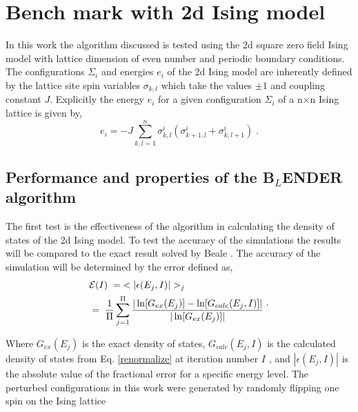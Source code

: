 \documentclass[aps,pre,reprint,superscriptaddress,showkeys]{revtex4-1}
\begin{document}
\section{Bench mark with 2d Ising model}
\label{sec2}

In this work the algorithm discussed is tested using the 2d square zero field  Ising model with lattice dimension of even number\cite{exact_statistical,Onsager,Ising} and periodic boundary conditions. The configurations $\Sigma_i$ and energies $e_i$ of the 2d Ising model are inherently defined by the lattice site spin variables $\sigma_{k,l}$ which take the values $\pm 1$ and coupling constant $J$. Explicitly the energy $e_i$ for a given configuration $\Sigma_i$ of a n$\times$n Ising lattice is given by, 
\begin{equation}
e_i = -J\sum_{k,l=1}^{n}\sigma_{k,l}^{i}(\sigma_{k+1,l}^{i} + \sigma_{k,l+1}^{i})\;.
\end{equation}

\subsection{Performance and properties of the B$_L$ENDER algorithm}
  The first test is the effectiveness of the algorithm in calculating the density of states of the 2d Ising model.  To test the accuracy of the simulations the results will be compared to the exact result solved by Beale \cite{Beale_2d_ising}. The accuracy of the simulation will be determined by the error defined as, 
\begin{equation}
\begin{split}
 &\mathcal{E}(I) \hspace{0.1cm}= \hspace{0.1cm}< |\epsilon(E_j,I)| >_j\\
& = \hspace{0.1cm}  \frac{1}{\Pi} \sum_{j=1}^{\Pi}\frac{|\ln[G_{ex}(E_j)]- \ln[G_{calc}(E_j,I)]|}{|\ln[G_{ex}(E_j)]|}\; 
 \end{split}. 
 \label{avg_error}
\end{equation}

Where $G_{ex}(E_j)$ is the exact density of states, $G_{calc}(E_j,I)$ is the calculated density of states from Eq. \ref{renormalize}  at iteration number $I$ , and $|\epsilon(E_j,I)|$ is the absolute value of the fractional error for a specific energy level.  The perturbed configurations in this work were generated by randomly flipping one spin on the Ising lattice
\end{document}
